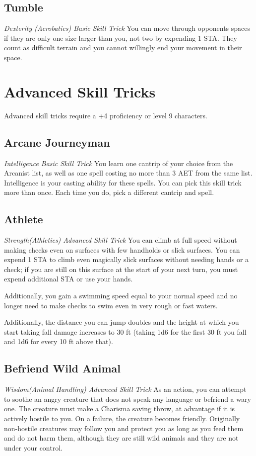 \subsection{Tumble}\label{st:tumble}
\textit{Dexterity (Acrobatics) Basic Skill Trick}
You can move through opponents spaces if they are only one size larger than you, not two by expending 1 STA. They count as difficult terrain and you cannot willingly end your movement in their space.

\section{Advanced Skill Tricks}
\label{sec:skill-tricks-advanced}

Advanced skill tricks require a +4 proficiency or level 9 characters.

\subsection{Arcane Journeyman}
\textit{Intelligence Basic Skill Trick}
You learn one cantrip of your choice from the Arcanist list, as well as one spell costing no more than 3 AET from the same list. Intelligence is your casting ability for these spells. You can pick this skill trick more than once. Each time you do, pick a different cantrip and spell.

\subsection{Athlete}
\textit{Strength(Athletics) Advanced Skill Trick}
You can climb at full speed without making checks even on surfaces with few handholds or slick surfaces. You can expend 1 STA to climb even magically slick surfaces without needing hands or a check; if you are still on this surface at the start of your next turn, you must expend additional STA or use your hands.

Additionally, you gain a swimming speed equal to your normal speed and no longer need to make checks to swim even in very rough or fast waters.

Additionally, the distance you can jump doubles and the height at which you start taking fall damage increases to 30 ft (taking 1d6 for the first 30 ft you fall and 1d6 for every 10 ft above that).

\subsection{Befriend Wild Animal}
\textit{Wisdom(Animal Handling) Advanced Skill Trick}
As an action, you can attempt to soothe an angry creature that does not speak any language or befriend a wary one. The creature must make a Charisma saving throw, at advantage if it is actively hostile to you. On a failure, the creature becomes friendly. Originally non-hostile creatures may follow you and protect you as long as you feed them and do not harm them, although they are still wild animals and they are not under your control.


